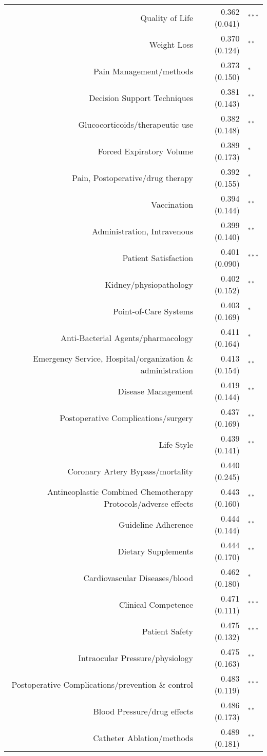 \begin{longtable}[l]{rr@{}l@{ }}
Quality of Life & 0.362 (0.041) & $^{***}$\\
Weight Loss & 0.370 (0.124) & $^{**}$\\
Pain Management/methods & 0.373 (0.150) & $^{*}$\\
Decision Support Techniques & 0.381 (0.143) & $^{**}$\\
Glucocorticoids/therapeutic use & 0.382 (0.148) & $^{**}$\\
Forced Expiratory Volume & 0.389 (0.173) & $^{*}$\\
Pain, Postoperative/drug therapy & 0.392 (0.155) & $^{*}$\\
Vaccination & 0.394 (0.144) & $^{**}$\\
Administration, Intravenous & 0.399 (0.140) & $^{**}$\\
Patient Satisfaction & 0.401 (0.090) & $^{***}$\\
Kidney/physiopathology & 0.402 (0.152) & $^{**}$\\
Point-of-Care Systems & 0.403 (0.169) & $^{*}$\\
Anti-Bacterial Agents/pharmacology & 0.411 (0.164) & $^{*}$\\
Emergency Service, Hospital/organization \& administration & 0.413 (0.154) & $^{**}$\\
Disease Management & 0.419 (0.144) & $^{**}$\\
Postoperative Complications/surgery & 0.437 (0.169) & $^{**}$\\
Life Style & 0.439 (0.141) & $^{**}$\\
Coronary Artery Bypass/mortality & 0.440 (0.245) & $^{}$\\
Antineoplastic Combined Chemotherapy Protocols/adverse effects & 0.443 (0.160) & $^{**}$\\
Guideline Adherence & 0.444 (0.144) & $^{**}$\\
Dietary Supplements & 0.444 (0.170) & $^{**}$\\
Cardiovascular Diseases/blood & 0.462 (0.180) & $^{*}$\\
Clinical Competence & 0.471 (0.111) & $^{***}$\\
Patient Safety & 0.475 (0.132) & $^{***}$\\
Intraocular Pressure/physiology & 0.475 (0.163) & $^{**}$\\
Postoperative Complications/prevention \& control & 0.483 (0.119) & $^{***}$\\
Blood Pressure/drug effects & 0.486 (0.173) & $^{**}$\\
Catheter Ablation/methods & 0.489 (0.181) & $^{**}$\\

\end{longtable}
